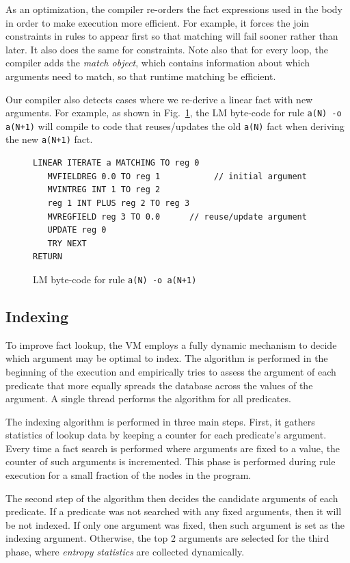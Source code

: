 \documentclass{sigplanconf}
\begin{document}
As an optimization, the compiler re-orders the fact expressions used
in the body in order to make execution more efficient. For example, it
forces the join constraints in rules to appear first so that matching
will fail sooner rather than later. It also does the same for
constraints. Note also that for every loop, the compiler adds
the \emph{match object}, which contains information about which
arguments need to match, so that runtime matching be efficient.

Our compiler also detects cases where we re-derive a linear fact with
new arguments. For example, as shown in Fig.~\ref{code:update}, the LM
byte-code for rule \texttt{a(N) -o a(N+1)} will compile to code that
reuses/updates the old \texttt{a(N)} fact when deriving the
new \texttt{a(N+1)} fact.

\begin{figure}[ht]
{\footnotesize
\begin{Verbatim}
LINEAR ITERATE a MATCHING TO reg 0
   MVFIELDREG 0.0 TO reg 1           // initial argument
   MVINTREG INT 1 TO reg 2
   reg 1 INT PLUS reg 2 TO reg 3
   MVREGFIELD reg 3 TO 0.0      // reuse/update argument
   UPDATE reg 0
   TRY NEXT
RETURN
\end{Verbatim}
}
\caption{\small{LM byte-code for rule \texttt{a(N) -o a(N+1)}}}
\label{code:update}
\end{figure}


\subsection{Indexing}
\label{indexing}

To improve fact lookup, the VM employs a fully dynamic mechanism to
decide which argument may be optimal to index.  The algorithm is
performed in the beginning of the execution and empirically tries to
assess the argument of each predicate that more equally spreads the
database across the values of the argument.  A single thread performs
the algorithm for all predicates.

The indexing algorithm is performed in three main steps. First, it
gathers statistics of lookup data by keeping a counter for each
predicate's argument.  Every time a fact search is performed where
arguments are fixed to a value, the counter of such arguments is
incremented. This phase is performed during rule execution for a small
fraction of the nodes in the program.

The second step of the algorithm then decides the candidate arguments
of each predicate.  If a predicate was not searched with any fixed
arguments, then it will be not indexed.  If only one argument was
fixed, then such argument is set as the indexing argument. Otherwise,
the top 2 arguments are selected for the third phase,
where \emph{entropy statistics} are collected dynamically.
\end{document}
